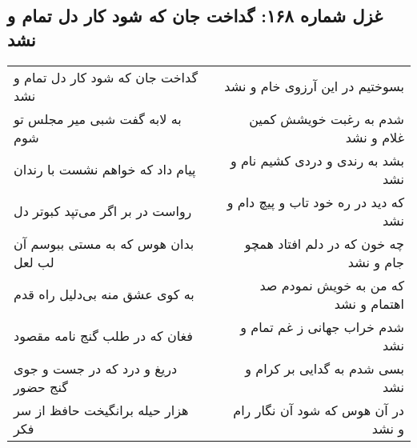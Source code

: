 \begin{center}
\section*{غزل شماره ۱۶۸: گداخت جان که شود کار دل تمام و نشد}
\label{sec:sh168}
\begin{longtable}{l p{0.5cm} r}
گداخت جان که شود کار دل تمام و نشد
&&
بسوختیم در این آرزوی خام و نشد
\\
به لابه گفت شبی میر مجلس تو شوم
&&
شدم به رغبت خویشش کمین غلام و نشد
\\
پیام داد که خواهم نشست با رندان
&&
بشد به رندی و دردی کشیم نام و نشد
\\
رواست در بر اگر می‌تپد کبوتر دل
&&
که دید در ره خود تاب و پیچ دام و نشد
\\
بدان هوس که به مستی ببوسم آن لب لعل
&&
چه خون که در دلم افتاد همچو جام و نشد
\\
به کوی عشق منه بی‌دلیل راه قدم
&&
که من به خویش نمودم صد اهتمام و نشد
\\
فغان که در طلب گنج نامه مقصود
&&
شدم خراب جهانی ز غم تمام و نشد
\\
دریغ و درد که در جست و جوی گنج حضور
&&
بسی شدم به گدایی بر کرام و نشد
\\
هزار حیله برانگیخت حافظ از سر فکر
&&
در آن هوس که شود آن نگار رام و نشد
\\
\end{longtable}
\end{center}
